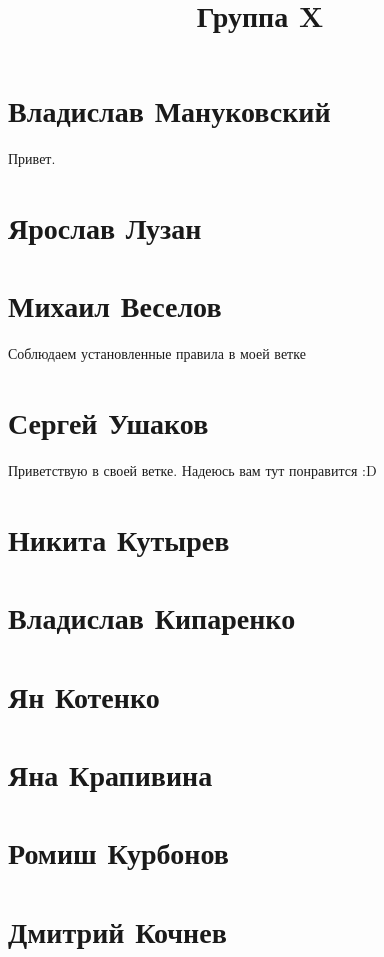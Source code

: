 \documentclass{article}
\title{Группа X}
\begin{document}
\section*{Владислав Мануковский}
Привет.
\section*{Ярослав Лузан}

\section*{Михаил Веселов}

Соблюдаем установленные правила в моей ветке

\section*{Сергей Ушаков}

Приветствую в своей ветке. Надеюсь вам тут понравится :D

\section*{Никита Кутырев}

\section*{Владислав Кипаренко}

\section*{Ян Котенко}

\section*{Яна Крапивина}

\section*{Ромиш Курбонов}

\section*{Дмитрий Кочнев}
\end{document}
